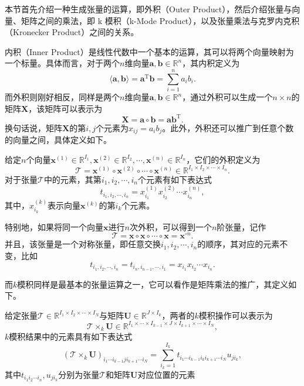 本节首先介绍一种生成张量的运算，即外积（Outer Product），然后介绍张量与向量、矩阵之间的乘法，即 k 模积（k-Mode Product），以及张量乘法与克罗内克积（Kronecker Product）之间的关系。

内积（Inner Product）是线性代数中一个基本的运算，其可以将两个向量映射为一个标量。具体而言，对于两个\( n \)维向量\( \bm{a}, \bm{b} \in \mathbb{R}^{n} \)，其内积定义为
\[
    \langle \bm{a}, \bm{b} \rangle = \bm{a}^{\mathrm{T}} \bm{b} = \sum_{i=1}^n a_i b_i.
\]
而外积则刚好相反，同样是两个\( n \)维向量\( \bm{a}, \bm{b} \in \mathbb{R}^{n} \)，通过外积可以生成一个\( n \times n \)的矩阵\( \mathbf{X} \)，该矩阵可以表示为
\[
    \mathbf{X} = \bm{a} \circ \bm{b} = \bm{a} \bm{b}^{\mathrm{T}}.
\]
换句话说，矩阵\( \mathbf{X} \)的第\( i,j \)个元素为\( x_{ij} = a_i b_j \)。此外，外积还可以推广到任意个数的向量之间，具体定义如下。
\begin{definition}\label{def:outer-product}
    给定\( n \)个向量\( \bm{x}^{(1)} \in \mathbb{R}^{I_1}, \bm{x}^{(2)} \in \mathbb{R}^{I_2}, \cdots, \bm{x}^{(n)} \in \mathbb{R}^{I_n} \)，它们的外积定义为
    \[
        \mathcal{T} = \bm{x}^{(1)} \circ \bm{x}^{(2)} \circ \cdots \circ \bm{x}^{(n)} \in \mathbb{R}^{I_1 \times I_2 \times \cdots \times I_n}.
    \]
    对于张量\( \mathcal{T} \)中的元素，其第\( i_1, i_2, \cdots, i_n \)个元素有如下表达式
    \[
        t_{i_1, i_2, \cdots, i_n} = x^{(1)}_{i_1} x^{(2)}_{i_2} \cdots x^{(n)}_{i_n},
    \]
    其中，\( x^{(k)}_{i_k} \)表示向量\( \bm{x}^{(k)} \)的第\( i_k \)个元素。
\end{definition}

特别地，如果将同一个向量\( \bm{x} \)进行\( n \)次外积，可以得到一个\( n \)阶张量，记作
\[
    \mathcal{T} = \bm{x} \circ \bm{x} \circ \cdots \circ \bm{x} = \bm{x}^{\circ n}.
\]
并且，该张量是一个对称张量，即任意交换\( i_1, i_2, \cdots, i_n \)的顺序，其对应的元素不变，比如
\[
    t_{i_1, i_2, \cdots, i_n} = t_{i_n, i_{n-1}, \cdots, i_1} = x_{i_1} x_{i_2} \cdots x_{i_n}.
\]

而$k$模积同样是最基本的张量运算之一，它可以看作是矩阵乘法的推广，其定义如下。
\begin{definition}%
    给定张量$\mathcal T \in \mathbb {R}^{I_1 \times I_2 \times \cdots \times I_N }$与矩阵$\mathbf U \in \mathbb {R}^{J \times I_k}$，两者的$k$模积操作可以表示为
    \begin{equation}
        \mathcal T \times_{k} \mathbf U \in \mathbb {R}^{I_1 \times \cdots \times I_{k-1} \times J \times I_{k+1}\times \cdots \times I_N },
    \end{equation}
    \( k \)模积结果中的元素具有如下表达式
    \begin{equation}
        (\mathcal T \times_{k} \mathbf U )_{i_1\cdots i_{k-1}ji_{k+1}\cdots i_N}=\sum_{i_{k}=1} ^{I_{k}} t_{i_1 \cdots i_{k-1}i_ki_{k+1} \cdots i_N} u_{ji_{k}},
    \end{equation}
    其中\( t_{i_1 i_2 \cdots i_n}, u_{ji_{k}} \)分别为张量\( \mathcal T \)和矩阵\( \mathbf{U} \)对应位置的元素
\end{definition}

